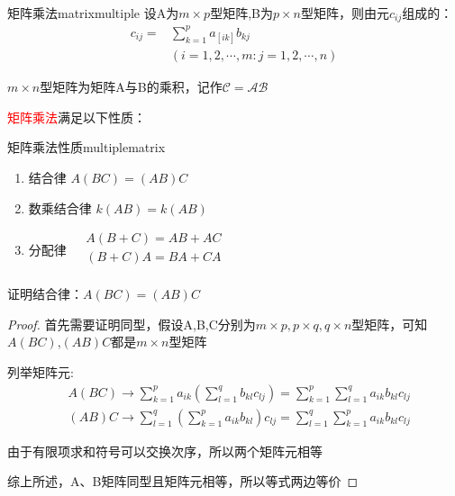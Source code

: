 \begin{definition}{矩阵乘法}{matrixmultiple}
	设A为$m\times p$型矩阵,B为$p\times n$型矩阵，则由元$c_{ij}$组成的：
	\begin{equation*}
		\begin{aligned}
			c_{ij}=&\sum_{k=1}^{p} a_[ik]b_{kj}\\
			&(i=1,2,\cdots,m:j=1,2,\cdots,n)
		\end{aligned}
	\end{equation*}

	$m\times n$型矩阵为矩阵A与B的乘积，记作$\mathcal{C=AB}$
\end{definition}

\textcolor{red}{矩阵乘法}满足以下性质：

\begin{theorem}{矩阵乘法性质}{multiplematrix}
	\begin{enumerate}
		\item {结合律      $A(BC)=(AB)C$}
		\item {数乘结合律      $k(AB)=k(AB)$}
		\item {分配律
			$\begin{aligned}
				&A(B+C)=AB+AC\\
				&(B+C)A=BA+CA\\
				\end{aligned}$}
	\end{enumerate}
\end{theorem}


\begin{problem}
	证明结合律：$A(BC)=(AB)C$

	\begin{proof}
		首先需要证明同型，假设A,B,C分别为$m\times p,p\times q,q\times n$型矩阵，可知$A(BC)$,$(AB)C$都是$m\times n$型矩阵

		列举矩阵元:
$$
\begin{aligned}
	&A(BC)\rightarrow \sum_{k=1}^{p}a_{ik}(\sum_{l=1}^{q}b_{kl}c_{lj})=\sum_{k=1}^{p}\sum_{l=1}^{q}a_{ik}b_{kl}c_{lj}\\
	&(AB)C\rightarrow \sum_{l=1}^q(\sum_{k=1}^pa_{ik}b_{kl})c_{lj}=\sum_{l=1}^{q}\sum_{k=1}^{p}a_{ik}b_{kl}c_{lj}
\end{aligned}
$$

由于有限项求和符号可以交换次序，所以两个矩阵元相等

综上所述，A、B矩阵同型且矩阵元相等，所以等式两边等价

	\end{proof}
\end{problem}

